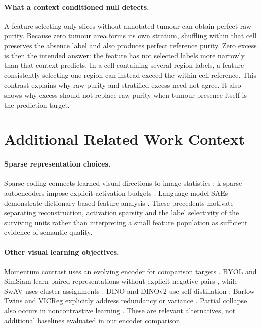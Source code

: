 \documentclass[letterpaper]{article}
\begin{document}
\paragraph{What a context conditioned null detects.}
A feature selecting only slices without annotated tumour can obtain perfect raw purity. Because zero tumour area forms its own stratum, shuffling within that cell preserves the absence label and also produces perfect reference purity. Zero excess is then the intended answer: the feature has not selected labels more narrowly than that context predicts. In a cell containing several region labels, a feature consistently selecting one region can instead exceed the within cell reference. This contrast explains why raw purity and stratified excess need not agree. It also shows why excess should not replace raw purity when tumour presence itself is the prediction target.

\section{Additional Related Work Context}\label{app:relatedcontext}
\paragraph{Sparse representation choices.}
Sparse coding connects learned visual directions to image statistics \cite{olshausen1996sparse}; k sparse autoencoders impose explicit activation budgets \cite{makhzani2013ksparse}. Language model SAEs demonstrate dictionary based feature analysis \cite{cunningham2023sparse}. These precedents motivate separating reconstruction, activation sparsity and the label selectivity of the surviving units rather than interpreting a small feature population as sufficient evidence of semantic quality.

\paragraph{Other visual learning objectives.}
Momentum contrast uses an evolving encoder for comparison targets \cite{he2020moco}. BYOL and SimSiam learn paired representations without explicit negative pairs \cite{grill2020byol,chen2021simsiam}, while SwAV uses cluster assignments \cite{caron2020swav}. DINO and DINOv2 use self distillation \cite{caron2021dino,oquab2023dinov2}; Barlow Twins and VICReg explicitly address redundancy or variance \cite{zbontar2021barlow,bardes2022vicreg}. Partial collapse also occurs in noncontrastive learning \cite{li2022collapse}. These are relevant alternatives, not additional baselines evaluated in our encoder comparison.
\end{document}

